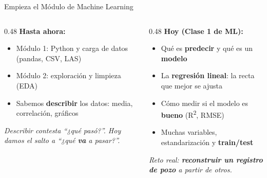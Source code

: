 \documentclass[aspectratio=169, 11pt]{beamer}
\begin{document}
\begin{frame}{Empieza el Módulo de Machine Learning}
  \vspace{-6pt}
  \begin{columns}[T]
    \begin{column}{0.48\textwidth}
      {\small\color{arcaDark}\bfseries\faCheckCircle\hspace{5pt}Hasta ahora:}
      \vspace{4pt}
      {\footnotesize\color{textMuted}
      \begin{itemize}\setlength{\itemsep}{3pt}
        \item[{\color{codeGreen}\scriptsize\faCheck}]
          Módulo 1: Python y carga de datos (pandas, CSV, LAS)
        \item[{\color{codeGreen}\scriptsize\faCheck}]
          Módulo 2: exploración y limpieza (EDA)
        \item[{\color{codeGreen}\scriptsize\faCheck}]
          Sabemos \textbf{describir} los datos: media, correlación, gráficos
      \end{itemize}
      }
      \vspace{8pt}
      {\scriptsize\color{textMuted}\itshape
        Describir contesta ``¿qué pasó?''.
        Hoy damos el salto a ``¿qué \textbf{va} a pasar?''.}
    \end{column}
    \begin{column}{0.48\textwidth}
      {\small\color{arcaDark}\bfseries\faForward\hspace{5pt}Hoy (Clase 1 de ML):}
      \vspace{4pt}
      {\footnotesize\color{textMuted}
      \begin{itemize}\setlength{\itemsep}{3pt}
        \item[{\color{arcaRed}\scriptsize\faArrowRight}]
          Qué es \textbf{predecir} y qué es un \textbf{modelo}
        \item[{\color{arcaRed}\scriptsize\faArrowRight}]
          La \textbf{regresión lineal}: la recta que mejor se ajusta
        \item[{\color{arcaRed}\scriptsize\faArrowRight}]
          Cómo medir si el modelo es \textbf{bueno} (R\textsuperscript{2}, RMSE)
        \item[{\color{arcaRed}\scriptsize\faArrowRight}]
          Muchas variables, estandarización y \textbf{train/test}
      \end{itemize}
      }
      \vspace{6pt}
      {\scriptsize\color{arcaDark}\itshape
        Reto real: \textbf{reconstruir un registro de pozo} a partir de otros.}
    \end{column}
  \end{columns}
\end{frame}
\end{document}

